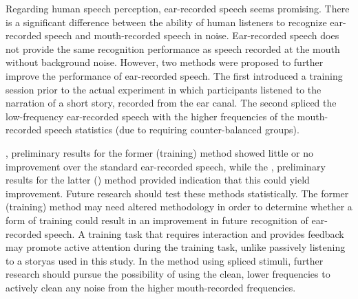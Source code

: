 Regarding human speech perception, ear-recorded speech seems promising.  There is a significant difference between the ability of human listeners to recognize ear-recorded speech and mouth-recorded speech in noise.  Ear-recorded speech does not provide the same recognition performance as speech recorded at the mouth without background noise.  However, two methods were proposed to further improve the performance of ear-recorded speech.  The first introduced a training session prior to the actual experiment in which participants listened to the narration of a short story, recorded from the ear canal.  The second spliced the low-frequency ear-recorded speech with the higher frequencies of the mouth-recorded speech \DIFdelbegin {}\DIFdelend \DIFaddbegin {}\DIFaddend statistics (due to requiring counter-balanced groups).  

\DIFdelbegin {}\DIFdelend \DIFaddbegin {}\DIFaddend , preliminary results for the former (training) method showed little or no improvement over the standard ear-recorded speech, while the \DIFdelbegin {}\DIFdelend \DIFaddbegin {}\DIFaddend , preliminary results for the latter (\DIFdelbegin {}\DIFdelend \DIFaddbegin {}\DIFaddend ) method provided \DIFaddbegin {}\DIFaddend indication that this could \DIFdelbegin {}\DIFdelend yield improvement.  Future research should test these methods statistically.  The former (training) method may need altered methodology in order to determine whether a form of training could result in an improvement in future recognition of ear-recorded speech.  A training task that requires interaction and provides feedback may promote active attention during the training task, unlike passively listening to a story\DIFaddbegin \DIFadd{, }\DIFaddend as used in this study.  In the method using spliced stimuli, further research should pursue the possibility of using the clean, lower frequencies to actively clean any noise from the higher mouth-recorded frequencies.  

